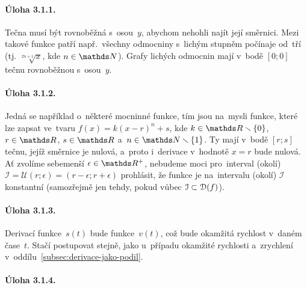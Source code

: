\appendix
{}

\paragraph{Úloha 3.1.1.}
Tečna musí být rovnoběžná s~osou~$y$, abychom nehohli najít její směrnici. Mezi
takové funkce patří např.\ všechny odmocniny s~lichým stupněm počínaje od~tří (tj.
$\sqrt[2n+1]{x}$, kde ${n \in \naturals}$). Grafy lichých odmocnin mají v~bodě
${[0; 0]}$ tečnu rovnoběžnou s~osou~$y$.

\paragraph{Úloha 3.1.2.}
Jedná se například o~některé mocninné funkce, tím jsou na~mysli funkce, které lze
zapsat ve~tvaru ${f(x) = k (x-r)^n + s}$, kde ${k \in \reals \smallsetminus \{0\}}$,
${r \in \reals}$, ${s \in \reals}$ a~${n \in \naturals \smallsetminus \{1\}}$. Ty
mají v~bodě ${[r; s]}$ tečnu, jejíž směrnice je nulová, a~proto i~derivace v~hodnotě
${x = r}$ bude nulová. Ať zvolíme sebemenší ${\epsilon \in \reals^{+}}$, nebudeme
moci pro~interval (okolí) ${\mathcal{I} = \mathcal{U}(r; \epsilon) = (r-\epsilon; r+\epsilon)}$
prohlásit, že funkce je na~intervalu (okolí) $\mathcal{I}$ konstantní (samozřejmě
jen tehdy, pokud vůbec ${\mathcal{I} \subset \mathcal{D}(f)}$).

\paragraph{Úloha 3.1.3.}
Derivací funkce~$s(t)$ bude funkce~$v(t)$, což bude okamžitá rychlost v~daném
čase~$t$. Stačí postupovat stejně, jako u~případu okamžité rychlosti a~zrychlení
v~oddílu~\ref{subsec:derivace-jako-podil}.

\paragraph{Úloha 3.1.4.}
